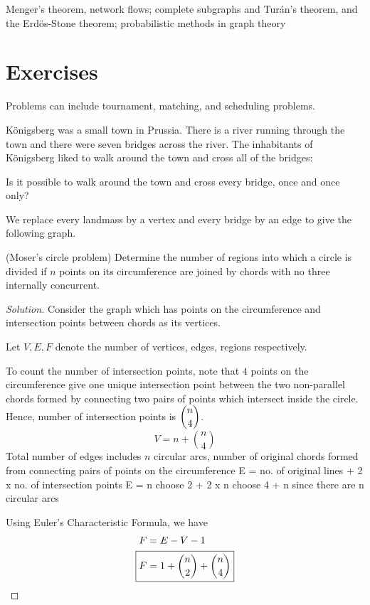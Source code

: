 Menger's theorem, network flows; complete subgraphs and Turán's theorem, and the Erdös-Stone theorem; probabilistic methods in graph theory
\pagebreak

\section*{Exercises}
Problems can include tournament, matching, and scheduling problems.
\begin{prbm}
K\"{o}nigsberg was a small town in Prussia. There is a river running through the town and there were seven bridges across the river. The inhabitants of K\"{o}nigsberg liked to walk around the town and cross all of the bridges:

Is it possible to walk around the town and cross every bridge, once and once only?
\end{prbm}

\begin{solution}
We replace every landmass by a vertex and every bridge by an edge to give the following graph.
\end{solution}

\begin{prbm}(Moser's circle problem) 
Determine the number of regions into which a circle is divided if $n$ points on its circumference are joined by chords with no three internally concurrent.
\end{prbm}

\begin{proof}[Solution]
Consider the graph which has points on the circumference and intersection points between chords as its vertices.

Let $V, E, F$ denote the number of vertices, edges, regions respectively.

To count the number of intersection points, note that $4$ points on the circumference give one unique intersection point between the two non-parallel chords formed by connecting two pairs of points which intersect inside the circle. Hence, number of intersection points is $\dbinom{n}{4}$. 
\[ V = n + \binom{n}{4} \]
Total number of edges includes $n$ circular arcs, number of original chords formed from connecting pairs of points on the circumference
E = no. of original lines + 2 x no. of intersection points
E = n choose 2 + 2 x n choose 4 + n
since there are n circular arcs

Using Euler's Characteristic Formula, we have 
\begin{align*}
F &= E - V - 1 \\
\Aboxed{F &= 1 + \binom{n}{2} + \binom{n}{4}}
\end{align*}
\end{proof}

